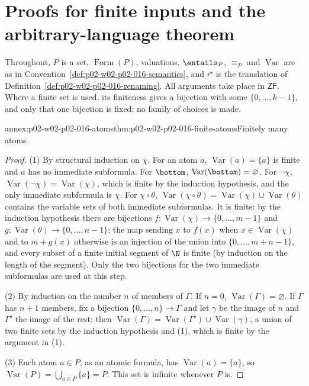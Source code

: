 \section{Proofs for finite inputs and the arbitrary-language theorem}
\label{sec:annex-p02-w02-p02-016-finite-input-scope}

Throughout, \(P\) is a set, \(\operatorname{Form}(P)\), valuations,
\(\entails_P\), \(\equiv_P\) and \(\operatorname{Var}\) are as in
Convention~\ref{def:p02-w02-p02-016-semantics}, and \(\mathsf r^{\star}\) is the
translation of Definition~\ref{def:p02-w02-p02-016-renaming}.  All arguments
take place in \(\mathsf{ZF}\).  Where a finite set is used, its finiteness
gives a bijection with some \(\{0,\ldots,k-1\}\), and only that one bijection
is fixed; no family of choices is made.

\begin{annexitem}{annex:p02-w02-p02-016-atoms}{thm:p02-w02-p02-016-finite-atoms}{Finitely many atoms}
\begin{proof}
(1) By structural induction on \(\chi\).  For an atom \(a\),
\(\operatorname{Var}(a)=\{a\}\) is finite and \(a\) has no immediate
subformula.  For \(\bottom\), \(\operatorname{Var}(\bottom)=\varnothing\).
For \(\neg\chi\), \(\operatorname{Var}(\neg\chi)=\operatorname{Var}(\chi)\),
which is finite by the induction hypothesis, and the only immediate
subformula is \(\chi\).  For \(\chi\circ\theta\),
\(\operatorname{Var}(\chi\circ\theta)=
\operatorname{Var}(\chi)\cup\operatorname{Var}(\theta)\) contains the
variable sets of both immediate subformulas.  It is finite: by the induction
hypothesis there are bijections \(f:\operatorname{Var}(\chi)\to\{0,\ldots,m-1\}\)
and \(g:\operatorname{Var}(\theta)\to\{0,\ldots,n-1\}\); the map sending \(x\)
to \(f(x)\) when \(x\in\operatorname{Var}(\chi)\) and to \(m+g(x)\) otherwise
is an injection of the union into \(\{0,\ldots,m+n-1\}\), and every subset of
a finite initial segment of \(\N\) is finite (by induction on the length of
the segment).  Only the two bijections for the two immediate subformulas are
used at this step.

(2) By induction on the number \(n\) of members of \(\Gamma\).  If \(n=0\),
\(\operatorname{Var}(\Gamma)=\varnothing\).  If \(\Gamma\) has \(n+1\)
members, fix a bijection \(\{0,\ldots,n\}\to\Gamma\) and let \(\gamma\) be the
image of \(n\) and \(\Gamma'\) the image of the rest; then
\(\operatorname{Var}(\Gamma)=\operatorname{Var}(\Gamma')\cup
\operatorname{Var}(\gamma)\), a union of two finite sets by the induction
hypothesis and (1), which is finite by the argument in (1).

(3) Each atom \(a\in P\), as an atomic formula, has
\(\operatorname{Var}(a)=\{a\}\), so
\(\operatorname{Var}(P)=\bigcup_{a\in P}\{a\}=P\).  This set is infinite
whenever \(P\) is.
\end{proof}
\end{annexitem}

